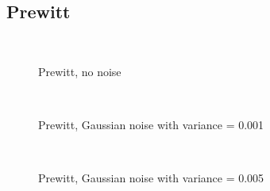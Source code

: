 \documentclass[10pt,a4paper]{article}
\begin{document}
\subsection{Prewitt}
\begin{figure}
  \centering
     \\
  \caption{Prewitt, no noise}
  \label{fig:prewitt_no_noise}
\end{figure}

\begin{figure}
  \centering
     \\
  \caption{Prewitt, Gaussian noise with variance = 0.001}
  \label{fig:prewitt_001}
\end{figure}

\begin{figure}
  \centering
     \\
  \caption{Prewitt, Gaussian noise with variance = 0.005}
  \label{fig:prewitt_005}
\end{figure}
\end{document}
